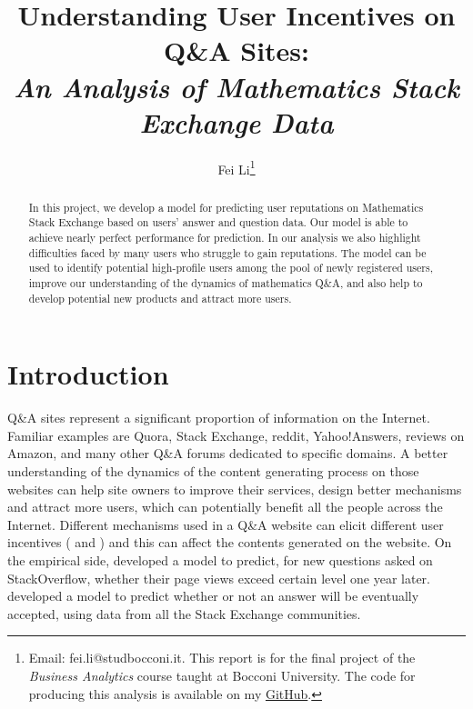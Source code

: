 \documentclass[12pt]{article}
\title{Understanding User Incentives on Q\&A Sites:\\{\emph{An Analysis of Mathematics Stack Exchange Data}}}
\author{Fei Li\footnote{Email: fei.li@studbocconi.it. This report is for the final project of the \emph{Business Analytics} course taught at Bocconi University. The code for producing this analysis is available on my \href{https://github.com/franli/business-analytics-project}{GitHub}.}}
\date{}
\begin{document}
\begin{titlepage}
\maketitle
\thispagestyle{empty}
\begin{abstract}
In this project, we develop a model for predicting user reputations on Mathematics Stack Exchange based on users' answer and question data. Our model is able to achieve nearly perfect performance for prediction. In our analysis we also highlight difficulties faced by many users who struggle to gain reputations. The model can be used to identify potential high-profile users among the pool of newly registered users, improve our understanding of the dynamics of mathematics Q\&A, and also help to develop potential new products and attract more users. 
\end{abstract}
\end{titlepage}

\tableofcontents
\clearpage

\section{Introduction}
Q\&A sites represent a significant proportion of information on the Internet.
Familiar examples are Quora, Stack Exchange, reddit, Yahoo!Answers, reviews on Amazon, and many other Q\&A forums dedicated to specific domains. A better understanding of the dynamics of the content generating process on those websites can help site owners to improve their services, design better mechanisms and attract more users, which can potentially benefit all the people across the Internet. Different mechanisms used in a Q\&A website can elicit different user incentives (\cite{jet} and \cite{yilingchen}) and this can affect the contents generated on the website.  On the empirical side, \cite{stackoverflow} developed a model to predict, for new questions asked on StackOverflow, whether their page views exceed certain level one year later. \cite{myopia} developed a model to predict whether or not an answer will be eventually accepted, using data from all the Stack Exchange communities. 
\end{document}
